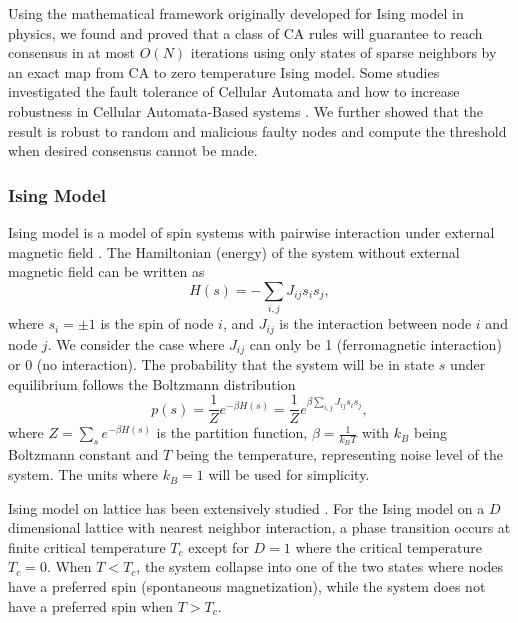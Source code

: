 \documentclass[reprint,pre,aps]{revtex4-1}
\begin{document}
Using the mathematical framework originally developed for Ising model \cite{ising1925beitrag} in physics, we found and proved that a class of CA rules will guarantee to reach consensus in at most $O(N)$ iterations using only states of sparse neighbors by an exact map from CA to zero temperature Ising model. Some studies investigated the fault tolerance of Cellular Automata and how to increase robustness in Cellular Automata-Based systems \cite{mccann2008fault, vzaloudek2011increasing, ccapuni2012turing}. We further showed that the result is robust to random and malicious faulty nodes and compute the threshold when desired consensus cannot be made.

\subsubsection{Ising Model}

Ising model is a model of spin systems with pairwise interaction under external magnetic field \cite{ising1925beitrag}. The Hamiltonian (energy) of the system without external magnetic field can be written as
\begin{equation}
H(s) = -\sum_{i, j} J_{ij} s_i s_j,
\end{equation}
where $s_i = \pm 1$ is the spin of node $i$, and $J_{ij}$ is the interaction between node $i$ and node $j$. We consider the case where $J_{ij}$ can only be 1 (ferromagnetic interaction) or 0 (no interaction). The probability that the system will be in state $s$ under equilibrium follows the Boltzmann distribution
\begin{equation}
p(s) = \frac{1}{Z} e^{-\beta H(s)} = \frac{1}{Z} e^{\beta \sum_{i, j} J_{ij} s_i s_j},
\end{equation}
where $Z = \sum_s e^{-\beta H(s)}$ is the partition function, $\beta = \frac{1}{k_B T}$ with $k_B$ being Boltzmann constant and $T$ being the temperature, representing noise level of the system. The units where $k_B = 1$ will be used for simplicity.

Ising model on lattice has been extensively studied \cite{ising1925beitrag, onsager1944crystal}. For the Ising model on a $D$ dimensional lattice with nearest neighbor interaction, a phase transition occurs at finite critical temperature $T_c$ except for $D = 1$ where the critical temperature $T_c = 0$. When $T < T_c$, the system collapse into one of the two states where nodes have a preferred spin (spontaneous magnetization), while the system does not have a preferred spin when $T > T_c$.
\end{document}
